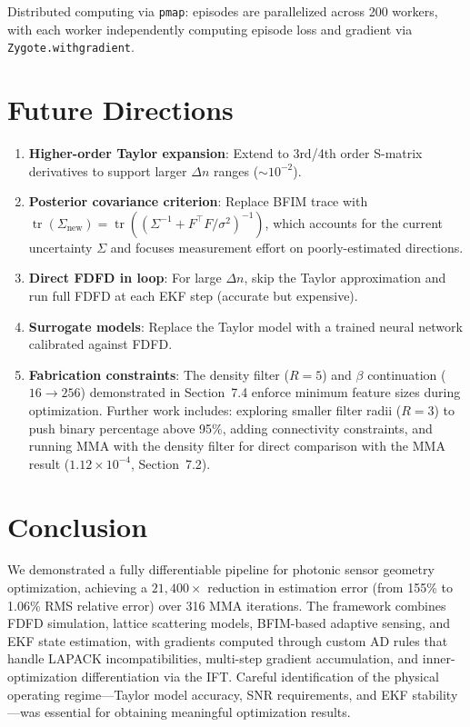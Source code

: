 \documentclass[11pt,a4paper]{article}
\newcommand{\tr}{\operatorname{tr}}
\begin{document}
Distributed computing via \texttt{pmap}: episodes are parallelized across 200 workers, with each worker independently computing episode loss and gradient via \texttt{Zygote.withgradient}.

\section{Future Directions}

\begin{enumerate}
  \item \textbf{Higher-order Taylor expansion}: Extend to 3rd/4th order S-matrix derivatives to support larger $\Delta n$ ranges ($\sim 10^{-2}$).

  \item \textbf{Posterior covariance criterion}: Replace BFIM trace with $\tr(\Sigma_{\text{new}}) = \tr((\Sigma^{-1} + F^\top F / \sigma^2)^{-1})$, which accounts for the current uncertainty $\Sigma$ and focuses measurement effort on poorly-estimated directions.

  \item \textbf{Direct FDFD in loop}: For large $\Delta n$, skip the Taylor approximation and run full FDFD at each EKF step (accurate but expensive).

  \item \textbf{Surrogate models}: Replace the Taylor model with a trained neural network calibrated against FDFD.

  \item \textbf{Fabrication constraints}: The density filter ($R = 5$) and $\beta$ continuation ($16 \to 256$) demonstrated in Section~7.4 enforce minimum feature sizes during optimization.  Further work includes: exploring smaller filter radii ($R = 3$) to push binary percentage above 95\%, adding connectivity constraints, and running MMA with the density filter for direct comparison with the MMA result ($1.12 \times 10^{-4}$, Section~7.2).
\end{enumerate}

\section{Conclusion}

We demonstrated a fully differentiable pipeline for photonic sensor geometry optimization, achieving a $21{,}400\times$ reduction in estimation error (from 155\% to 1.06\% RMS relative error) over 316 MMA iterations.  The framework combines FDFD simulation, lattice scattering models, BFIM-based adaptive sensing, and EKF state estimation, with gradients computed through custom AD rules that handle LAPACK incompatibilities, multi-step gradient accumulation, and inner-optimization differentiation via the IFT.  Careful identification of the physical operating regime---Taylor model accuracy, SNR requirements, and EKF stability---was essential for obtaining meaningful optimization results.
\end{document}
